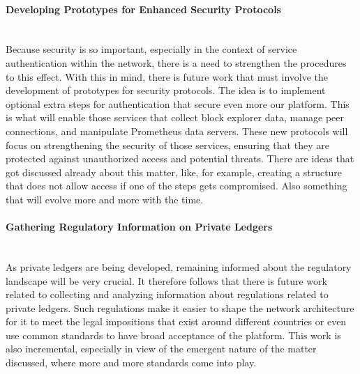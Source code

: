 \paragraph{Developing Prototypes for Enhanced Security Protocols}\mbox{}\\
Because security is so important, especially in the context of service authentication within the network, there is a need to strengthen the procedures to this effect. With this in mind, there is future work that must involve the development of prototypes for security protocols. The idea is to implement optional extra steps for authentication that secure even more our platform. This is what will enable those services that collect block explorer data, manage peer connections, and manipulate Prometheus data servers. These new protocols will focus on strengthening the security of those services, ensuring that they are protected against unauthorized access and potential threats. There are ideas that got discussed already about this matter, like, for example, creating a structure that does not allow access if one of the steps gets compromised. Also something that will evolve more and more with the time.

\paragraph{Gathering Regulatory Information on Private Ledgers}\mbox{}\\
As private ledgers are being developed, remaining informed about the regulatory landscape will be very crucial. It therefore follows that there is future work related to collecting and analyzing information about regulations related to private ledgers. Such regulations make it easier to shape the network architecture for it to meet the legal impositions that exist around different countries or even use common standards to have broad acceptance of the platform. This work is also incremental, especially in view of the emergent nature of the matter discussed, where more and more standards come into play.


